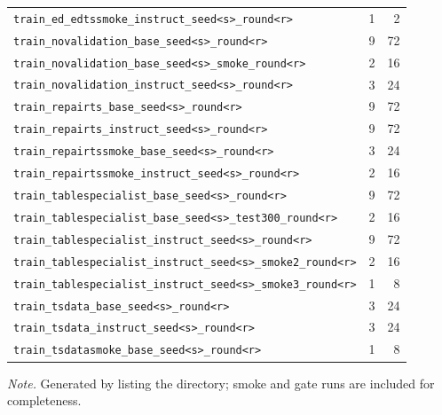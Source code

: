 {\begin{longtable}{@{}p{11.2cm}rr@{}}
\texttt{train\_ed\_edtssmoke\_instruct\_seed<s>\_round<r>} & 1 & 2\\
\texttt{train\_novalidation\_base\_seed<s>\_round<r>} & 9 & 72\\
\texttt{train\_novalidation\_base\_seed<s>\_smoke\_round<r>} & 2 & 16\\
\texttt{train\_novalidation\_instruct\_seed<s>\_round<r>} & 3 & 24\\
\texttt{train\_repairts\_base\_seed<s>\_round<r>} & 9 & 72\\
\texttt{train\_repairts\_instruct\_seed<s>\_round<r>} & 9 & 72\\
\texttt{train\_repairtssmoke\_base\_seed<s>\_round<r>} & 3 & 24\\
\texttt{train\_repairtssmoke\_instruct\_seed<s>\_round<r>} & 2 & 16\\
\texttt{train\_tablespecialist\_base\_seed<s>\_round<r>} & 9 & 72\\
\texttt{train\_tablespecialist\_base\_seed<s>\_test300\_round<r>} & 2 & 16\\
\texttt{train\_tablespecialist\_instruct\_seed<s>\_round<r>} & 9 & 72\\
\texttt{train\_tablespecialist\_instruct\_seed<s>\_smoke2\_round<r>} & 2 & 16\\
\texttt{train\_tablespecialist\_instruct\_seed<s>\_smoke3\_round<r>} & 1 & 8\\
\texttt{train\_tsdata\_base\_seed<s>\_round<r>} & 3 & 24\\
\texttt{train\_tsdata\_instruct\_seed<s>\_round<r>} & 3 & 24\\
\texttt{train\_tsdatasmoke\_base\_seed<s>\_round<r>} & 1 & 8\\
\end{longtable}
}
\vspace{-0.6\baselineskip}
{\footnotesize\color{slate}\textit{Note.} Generated by listing the directory; smoke and gate runs are included for completeness.\par}
\medskip
